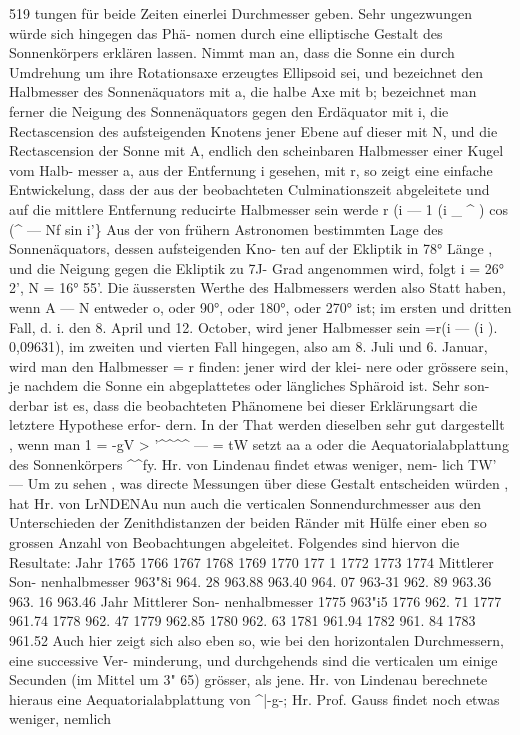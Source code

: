 \documentclass[12pt,a4paper]{article}
\begin{document}
519 tungen  für  beide  Zeiten  einerlei  Durchmesser  geben.  Sehr  ungezwungen  würde  sich  hingegen  das  Phä- nomen durch  eine  elliptische  Gestalt  des  Sonnenkörpers  erklären  lassen.  Nimmt  man  an,  dass  die  Sonne ein  durch  Umdrehung  um  ihre  Rotationsaxe  erzeugtes  Ellipsoid  sei,  und  bezeichnet  den  Halbmesser  des Sonnenäquators  mit  a,  die  halbe  Axe  mit  b;  bezeichnet  man  ferner  die  Neigung  des  Sonnenäquators gegen  den  Erdäquator  mit  i,  die  Rectascension  des  aufsteigenden  Knotens  jener  Ebene  auf  dieser  mit N,  und  die  Rectascension  der  Sonne  mit  A,  endlich  den  scheinbaren  Halbmesser  einer  Kugel  vom  Halb- messer a,  aus  der  Entfernung  i  gesehen,  mit  r,  so  zeigt  eine  einfache  Entwickelung,  dass  der  aus  der beobachteten  Culminationszeit  abgeleitete  und  auf  die  mittlere  Entfernung  reducirte  Halbmesser  sein  werde r  (i  ---  1  (i  \_  \textasciicircum{} )  cos  (\textasciicircum{}  ---  Nf  sin  i'\} Aus  der  von  frühern  Astronomen  bestimmten  Lage  des  Sonnenäquators,  dessen  aufsteigenden  Kno- ten auf  der  Ekliptik  in  78°  Länge ,  und  die  Neigung  gegen  die  Ekliptik  zu  7J-  Grad  angenommen  wird, folgt  i  =  26°  2',  N  =  16°  55'.  Die  äussersten  Werthe  des  Halbmessers  werden  also  Statt  haben,  wenn A  ---  N  entweder  o,    oder  90°,  oder  180°,  oder  270°  ist;   im  ersten  und   dritten  Fall,    d.  i.    den  8.  April und  12.  October,   wird  jener  Halbmesser   sein    =r(i  --- (i   ). 0,09631),    im  zweiten  und  vierten  Fall hingegen,  also  am  8.  Juli  und  6.  Januar,  wird  man  den  Halbmesser  =  r  finden:  jener  wird  der  klei- nere oder  grössere  sein,  je  nachdem  die  Sonne  ein  abgeplattetes  oder  längliches  Sphäroid  ist.  Sehr  son- derbar ist  es,  dass  die  beobachteten  Phänomene  bei  dieser  Erklärungsart  die  letztere  Hypothese  erfor- dern.   In  der  That  werden  dieselben  sehr  gut  dargestellt ,  wenn  man   1  =  -gV  >  '\textasciicircum{}\textasciicircum{}\textasciicircum{}\textasciicircum{}  ---  =  tW  setzt aa  a oder  die  Aequatorialabplattung  des  Sonnenkörpers  \textasciicircum{}\textasciicircum{}fy.  Hr.  von  Lindenau  findet  etwas  weniger,  nem- lich  TW'  ---  Um  zu  sehen ,  was  directe  Messungen  über  diese  Gestalt  entscheiden  würden ,  hat  Hr.  von LrNDENAu  nun  auch  die  verticalen  Sonnendurchmesser  aus  den  Unterschieden  der  Zenithdistanzen  der beiden  Ränder  mit  Hülfe  einer  eben  so  grossen  Anzahl  von  Beobachtungen  abgeleitet.  Folgendes  sind hiervon  die  Resultate: Jahr 1765 1766 1767 1768 1769 1770 177 1 1772 1773 1774 Mittlerer  Son- nenhalbmesser 963"8i 964. 28 963.88 963.40 964.  07 963-31 962. 89 963.36 963. 16 963.46 Jahr Mittlerer  Son- nenhalbmesser 1775 963"i5 1776 962.  71 1777 961.74 1778 962.  47 1779 962.85 1780 962.  63 1781 961.94 1782 961. 84 1783 961.52 Auch  hier  zeigt  sich  also  eben  so,  wie  bei  den  horizontalen  Durchmessern,  eine  successive  Ver- minderung, und  durchgehends  sind  die  verticalen  um  einige  Secunden  (im  Mittel  um  3"  65)  grösser,  als jene.  Hr.  von  Lindenau  berechnete  hieraus  eine  Aequatorialabplattung  von  \textasciicircum{}|-g-;  Hr.  Prof.  Gauss  findet noch  etwas  weniger,  nemlich 
\end{document}
